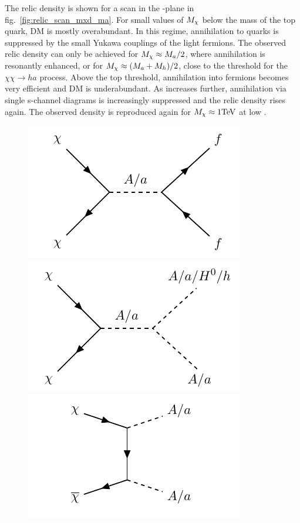 The relic density is shown for a scan in the \ma-\mDM plane in fig.~\ref{fig:relic_scan_mxd_ma}.
For small values of $M_{\chi}$ below the mass of the top quark, DM is mostly overabundant. In this regime, annihilation to quarks is suppressed by the small Yukawa couplings of the light fermions. The observed relic density can only be achieved for $M_{\chi}\approx M_{a}/2$, where annihilation is resonantly enhanced, or for $M_{\chi} \approx (M_{a}+M_{h})/2$, close to the threshold for the $\chi\chi\rightarrow h a$ process.
Above the top threshold, annihilation into fermions becomes very efficient and DM is underabundant. As \mDM increases further, annihilation via single s-channel diagrams is increasingly suppressed and the relic density rises again. The observed density is reproduced again for $M_{\chi}\approx1 \mathrm{TeV}$ at low \ma.

\begin{figure}[h]
\centering
\includegraphics[]{texinputs/05_relic/figures/feynman/graph_2hdm_relic_s_fermions.pdf}
\includegraphics[]{texinputs/05_relic/figures/feynman/graph_2hdm_relic_s_bosons.pdf}
\includegraphics[]{texinputs/05_relic/figures/feynman/graph_2hdm_relic_ss_bosons.pdf}

\end{figure}
